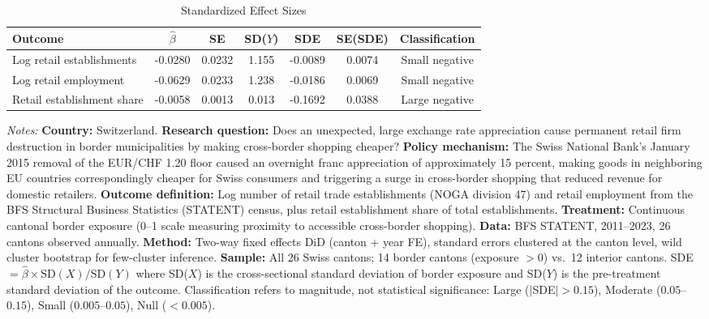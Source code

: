 \begin{table}[t]
\centering
\caption{Standardized Effect Sizes}
\label{tab:sde}
\begin{adjustbox}{max width=\textwidth}
\begin{tabular}{lcccccc}
\toprule
Outcome & $\hat{\beta}$ & SE & SD($Y$) & SDE & SE(SDE) & Classification \\
\midrule
Log retail establishments & -0.0280 & 0.0232 & 1.155 & -0.0089 & 0.0074 & Small negative \\
Log retail employment & -0.0629 & 0.0233 & 1.238 & -0.0186 & 0.0069 & Small negative \\
Retail establishment share & -0.0058 & 0.0013 & 0.013 & -0.1692 & 0.0388 & Large negative \\
\bottomrule
\end{tabular}
\end{adjustbox}
\begin{tablenotes}
\item \textit{Notes:} \textbf{Country:} Switzerland. \textbf{Research question:} Does an unexpected, large exchange rate appreciation cause permanent retail firm destruction in border municipalities by making cross-border shopping cheaper? \textbf{Policy mechanism:} The Swiss National Bank's January 2015 removal of the EUR/CHF 1.20 floor caused an overnight franc appreciation of approximately 15 percent, making goods in neighboring EU countries correspondingly cheaper for Swiss consumers and triggering a surge in cross-border shopping that reduced revenue for domestic retailers. \textbf{Outcome definition:} Log number of retail trade establishments (NOGA division 47) and retail employment from the BFS Structural Business Statistics (STATENT) census, plus retail establishment share of total establishments. \textbf{Treatment:} Continuous cantonal border exposure (0--1 scale measuring proximity to accessible cross-border shopping). \textbf{Data:} BFS STATENT, 2011--2023, 26 cantons observed annually. \textbf{Method:} Two-way fixed effects DiD (canton + year FE), standard errors clustered at the canton level, wild cluster bootstrap for few-cluster inference. \textbf{Sample:} All 26 Swiss cantons; 14 border cantons (exposure $> 0$) vs.\ 12 interior cantons. SDE $= \hat{\beta} \times \text{SD}(X) / \text{SD}(Y)$ where SD($X$) is the cross-sectional standard deviation of border exposure and SD($Y$) is the pre-treatment standard deviation of the outcome. Classification refers to magnitude, not statistical significance: Large ($|$SDE$| > 0.15$), Moderate ($0.05$--$0.15$), Small ($0.005$--$0.05$), Null ($< 0.005$).
\end{tablenotes}
\end{table}
